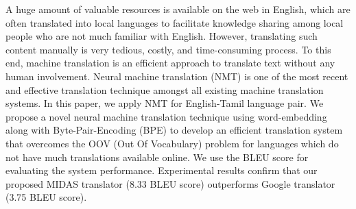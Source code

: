 A huge amount of valuable resources is available on the web in English, which are often translated into local languages to facilitate knowledge sharing among local people who are not much familiar with English. However, translating such content manually is very tedious, costly, and time-consuming process. To this end, machine translation is an efficient approach to translate text without any human involvement. Neural machine translation (NMT) is one of the most recent and effective translation technique amongst all existing machine translation systems. In this paper, we apply NMT for English-Tamil language pair. We propose a novel neural machine translation technique using word-embedding along with Byte-Pair-Encoding (BPE) to develop an efficient translation system that overcomes the OOV (Out Of Vocabulary) problem for  languages which do not have much translations available online. We use the BLEU score for evaluating the system performance. Experimental results confirm that our proposed MIDAS translator (8.33 BLEU score) outperforms Google translator (3.75 BLEU score).

